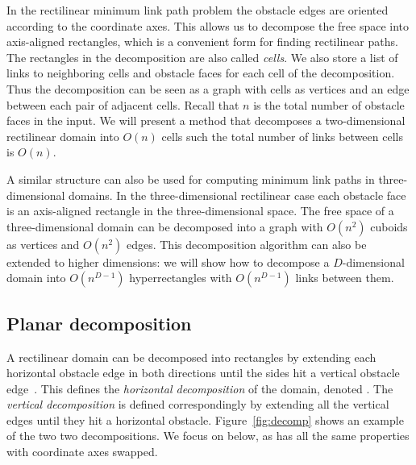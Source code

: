 \documentclass[english,gradu]{tktltiki2018}
\begin{document}
In the rectilinear minimum link path problem the obstacle edges are oriented according to the coordinate axes.
This allows us to decompose the free space into axis-aligned rectangles, which is a convenient form for finding rectilinear paths.
The rectangles in the decomposition are also called \emph{cells}.
We also store a list of links to neighboring cells and obstacle faces for each cell of the decomposition.
Thus the decomposition can be seen as a graph with cells as vertices and an edge between each pair of adjacent cells.
Recall that $n$ is the total number of obstacle faces in the input.
We will present a method that decomposes a two-dimensional rectilinear domain into $O(n)$ cells such the total number of links between cells is $O(n)$.

A similar structure can also be used for computing minimum link paths in three-dimensional domains.
In the three-dimensional rectilinear case each obstacle face is an axis-aligned rectangle in the three-dimensional space.
The free space of a three-dimensional domain can be decomposed into a graph with $O(n^2)$ cuboids as vertices and $O(n^2)$ edges.
This decomposition algorithm can also be extended to higher dimensions:
we will show how to decompose a $D$-dimensional domain into $O(n^{D-1})$ hyperrectangles with $O(n^{D-1})$ links between them.

\subsection{Planar decomposition}\label{sec:decomp2d}

A rectilinear domain can be decomposed into rectangles by extending each horizontal obstacle edge in both directions until the sides hit a vertical obstacle edge~\cite{imai86}.
This defines the \emph{horizontal decomposition} of the domain, denoted .
The \emph{vertical decomposition}  is defined correspondingly by extending all the vertical edges until they hit a horizontal obstacle.
Figure~\ref{fig:decomp} shows an example of the two two decompositions.
We focus on  below, as  has all the same properties with coordinate axes swapped.
\end{document}

